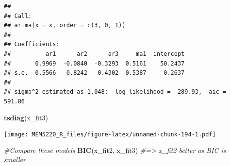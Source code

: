 \documentclass[]{book}
\newenvironment{Shaded}{\begin{snugshade}}{\end{snugshade}}
\newcommand{\CommentTok}[1]{\textcolor[rgb]{0.56,0.35,0.01}{\textit{#1}}}
\newcommand{\KeywordTok}[1]{\textcolor[rgb]{0.13,0.29,0.53}{\textbf{#1}}}
\newcommand{\NormalTok}[1]{#1}
\begin{document}
\begin{verbatim}
## 
## Call:
## arima(x = x, order = c(3, 0, 1))
## 
## Coefficients:
##          ar1      ar2      ar3     ma1  intercept
##       0.9969  -0.0840  -0.3293  0.5161    50.2437
## s.e.  0.5566   0.8242   0.4302  0.5387     0.2637
## 
## sigma^2 estimated as 1.048:  log likelihood = -289.93,  aic = 591.86
\end{verbatim}

\begin{Shaded}
\begin{Highlighting}[]
\KeywordTok{tsdiag}\NormalTok{(x_fit3)}
\end{Highlighting}
\end{Shaded}

\texttt{[image: MEM5220\_R\_files/figure-latex/unnamed-chunk-194-1.pdf]}

\begin{Shaded}
\begin{Highlighting}[]
\CommentTok{#Compare these models}
\KeywordTok{BIC}\NormalTok{(x_fit2, x_fit3) }\CommentTok{#=> x_fit2 better as BIC is smaller}
\end{Highlighting}
\end{Shaded}

 
  \providecommand{\huxb}[2]{\arrayrulecolor[RGB]{#1}\global\arrayrulewidth=#2pt}
  \providecommand{\huxvb}[2]{\color[RGB]{#1}\vrule width #2pt}
  \providecommand{\huxtpad}[1]{\rule{0pt}{\baselineskip+#1}}
  \providecommand{\huxbpad}[1]{\rule[-#1]{0pt}{#1}}
\end{document}
